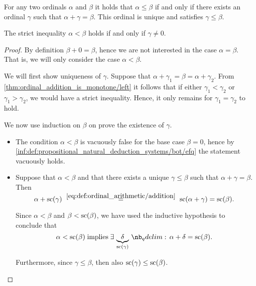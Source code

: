 \begin{proposition}\label{thm:ordinal_ordering_via_addition}
  For any two ordinals \( \alpha \) and \( \beta \) it holds that \( \alpha \leq \beta \) if and only if there exists an ordinal \( \gamma \) such that \( \alpha + \gamma = \beta \). This ordinal is unique and satisfies \( \gamma \leq \beta \).

  The strict inequality \( \alpha < \beta \) holds if and only if \( \gamma \neq 0 \).
\end{proposition}
\begin{proof}
  \SufficiencySubProof By definition \( \beta + 0 = \beta \), hence we are not interested in the case \( \alpha = \beta \). That is, we will only consider the case \( \alpha < \beta \).

  We will first show uniqueness of \( \gamma \). Suppose that \( \alpha + \gamma_1 = \beta = \alpha + \gamma_2 \). From \eqref{thm:ordinal_addition_is_monotone/left} it follows that if either \( \gamma_1 < \gamma_2 \) or \( \gamma_1 > \gamma_2 \), we would have a strict inequality. Hence, it only remains for \( \gamma_1 = \gamma_2 \) to hold.

  We now use induction on \( \beta \) on prove the existence of \( \gamma \).
  \begin{itemize}
    \item The condition \( \alpha < \beta \) is vacuously false for the base case \( \beta = 0 \), hence by \ref{inf:def:propositional_natural_deduction_systems/bot/efq} the statement vacuously holds.

    \item Suppose that \( \alpha < \beta \) and that there exists a unique \( \gamma \leq \beta \) such that \( \alpha + \gamma = \beta \). Then
    \begin{equation*}
      \alpha + \op{sc}(\gamma)
      \reloset {\eqref{eq:def:ordinal_arithmetic/addition}} =
      \op{sc}(\alpha + \gamma)
      =
      \op{sc}(\beta).
    \end{equation*}

    Since \( \alpha < \beta \) and \( \beta < \op{sc}(\beta) \), we have used the inductive hypothesis to conclude that
    \begin{equation*}
      \alpha < \op{sc}(\beta) \T{implies} \qexists* {\underbrace{\delta}_{\mathclap{\op{sc}(\gamma)}}} \alpha + \delta = \op{sc}(\beta).
    \end{equation*}

    Furthermore, since \( \gamma \leq \beta \), then also \( \op{sc}(\gamma) \leq \op{sc}(\beta) \).


\end{itemize}
\end{proof}
